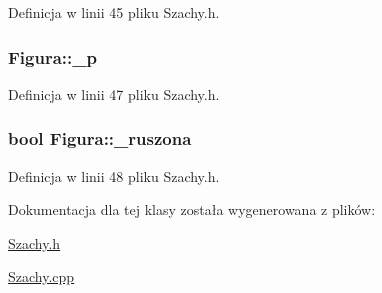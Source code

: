 \-Definicja w linii 45 pliku \-Szachy.\-h.

\hypertarget{class_figura_a25ab1d2e33d9af3b5102611f4a7d6cc2}{
\subsubsection[{\-\_\-p}]{ {\bf \-Figura\-::\-\_\-p}}}\label{class_figura_a25ab1d2e33d9af3b5102611f4a7d6cc2}


\-Definicja w linii 47 pliku \-Szachy.\-h.

\hypertarget{class_figura_ad1b0a2ce4c66a6f48eabaf869a2c63f9}{
\subsubsection[{\-\_\-ruszona}]{\setlength{\rightskip}{0pt plus 5cm}bool {\bf \-Figura\-::\-\_\-ruszona}}}\label{class_figura_ad1b0a2ce4c66a6f48eabaf869a2c63f9}


\-Definicja w linii 48 pliku \-Szachy.\-h.



\-Dokumentacja dla tej klasy została wygenerowana z plików\-:\begin{DoxyCompactItemize}
\item 
\hyperlink{_szachy_8h}{\-Szachy.\-h}\item 
\hyperlink{_szachy_8cpp}{\-Szachy.\-cpp}\end{DoxyCompactItemize}
